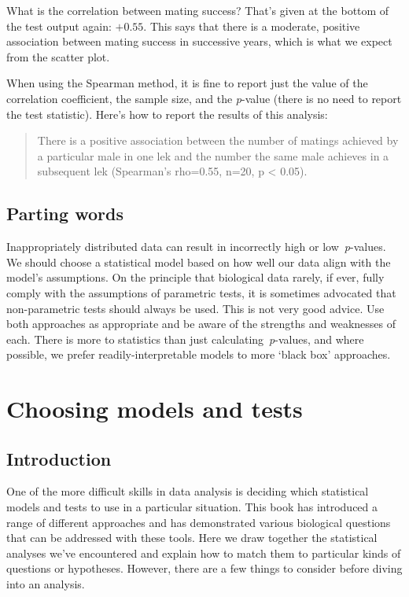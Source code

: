 \documentclass[
]{book}
\begin{document}
What is the correlation between mating success? That's given at the bottom of the test output again: \(+0.55\). This says that there is a moderate, positive association between mating success in successive years, which is what we expect from the scatter plot.

When using the Spearman method, it is fine to report just the value of the correlation coefficient, the sample size, and the \emph{p}-value (there is no need to report the test statistic). Here's how to report the results of this analysis:

\begin{quote}
There is a positive association between the number of matings achieved by a particular male in one lek and the number the same male achieves in a subsequent lek (Spearman's rho=0.55, n=20, p \textless{} 0.05).
\end{quote}

\hypertarget{parting-words}{%
\section{Parting words}\label{parting-words}}

Inappropriately distributed data can result in incorrectly high or low~\emph{p}-values. We should choose a statistical model based on how well our data align with the model's assumptions. On the principle that biological data rarely, if ever, fully comply with the assumptions of parametric tests, it is sometimes advocated that non-parametric tests should always be used. This is not very good advice. Use both approaches as appropriate and be aware of the strengths and weaknesses of each. There is more to statistics than just calculating~\emph{p}-values, and where possible, we prefer readily-interpretable models to more `black box' approaches.

\hypertarget{appendix-supplementary-material}{%
\appendix}


\hypertarget{choosing-models-and-tests}{%
\chapter{Choosing models and tests}\label{choosing-models-and-tests}}

\hypertarget{intro}{%
\section{Introduction}\label{intro}}

One of the more difficult skills in data analysis is deciding which statistical models and tests to use in a particular situation. This book has introduced a range of different approaches and has demonstrated various biological questions that can be addressed with these tools. Here we draw together the statistical analyses we've encountered and explain how to match them to particular kinds of questions or hypotheses. However, there are a few things to consider before diving into an analysis.
\end{document}
